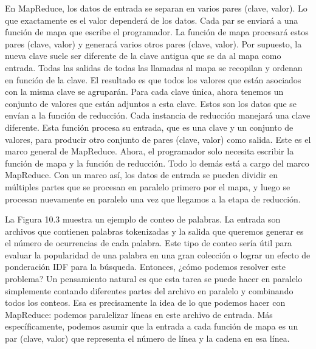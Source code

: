 En MapReduce, los datos de entrada se separan en varios pares (clave, valor). Lo que exactamente es el valor dependerá de los datos. Cada par se enviará a una función de mapa que escribe el programador. La función de mapa procesará estos pares (clave, valor) y generará varios otros pares (clave, valor). Por supuesto, la nueva clave suele ser diferente de la clave antigua que se da al mapa como entrada. Todas las salidas de todas las llamadas al mapa se recopilan y ordenan en función de la clave. El resultado es que todos los valores que están asociados con la misma clave se agruparán. Para cada clave única, ahora tenemos un conjunto de valores que están adjuntos a esta clave. Estos son los datos que se envían a la función de reducción. Cada instancia de reducción manejará una clave diferente. Esta función procesa su entrada, que es una clave y un conjunto de valores, para producir otro conjunto de pares (clave, valor) como salida. Este es el marco general de MapReduce. Ahora, el programador solo necesita escribir la función de mapa y la función de reducción. Todo lo demás está a cargo del marco MapReduce. Con un marco así, los datos de entrada se pueden dividir en múltiples partes que se procesan en paralelo primero por el mapa, y luego se procesan nuevamente en paralelo una vez que llegamos a la etapa de reducción.

La Figura 10.3 muestra un ejemplo de conteo de palabras. La entrada son archivos que contienen palabras tokenizadas y la salida que queremos generar es el número de ocurrencias de cada palabra. Este tipo de conteo sería útil para evaluar la popularidad de una palabra en una gran colección o lograr un efecto de ponderación IDF para la búsqueda. Entonces, ¿cómo podemos resolver este problema? Un pensamiento natural es que esta tarea se puede hacer en paralelo simplemente contando diferentes partes del archivo en paralelo y combinando todos los conteos. Esa es precisamente la idea de lo que podemos hacer con MapReduce: podemos paralelizar líneas en este archivo de entrada. Más específicamente, podemos asumir que la entrada a cada función de mapa es un par (clave, valor) que representa el número de línea y la cadena en esa línea.

